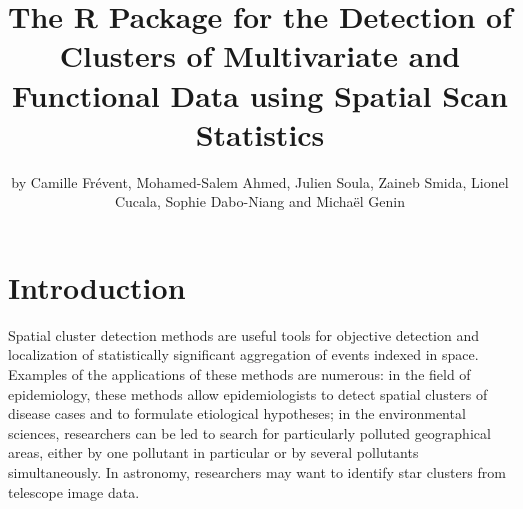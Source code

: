 \title{The R Package  for the Detection of Clusters of Multivariate and Functional Data using Spatial Scan Statistics}
\author{by Camille Frévent, Mohamed-Salem Ahmed, Julien Soula, Zaineb Smida, Lionel Cucala, Sophie Dabo-Niang and Michaël Genin}

\maketitle




\section{Introduction} \label{sec:intro}
Spatial cluster detection methods are useful tools for objective detection and localization of statistically significant aggregation of events indexed in space. Examples of the applications of these methods are numerous: in the field of epidemiology, these methods allow epidemiologists to detect spatial clusters of disease cases and to formulate etiological hypotheses; in the environmental sciences, researchers can be led to search for particularly polluted geographical areas, either by one pollutant in particular or by several pollutants simultaneously. In astronomy, researchers may want to identify star clusters from telescope image data.\\

